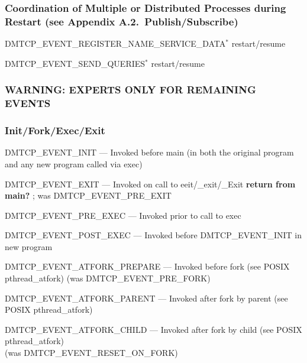 \documentclass{article}
\begin{document}
\subsubsection*{Coordination of Multiple or Distributed Processes during Restart
	(see Appendix A.2.~Publish/Subscribe)}
\begin{list}{}{\leftmargin=3em \itemindent=-2em}
\item
  DMTCP\_EVENT\_REGISTER\_NAME\_SERVICE\_DATA$^*$ restart/resume
\item
  DMTCP\_EVENT\_SEND\_QUERIES$^*$ restart/resume
\end{list}

\subsubsection*{WARNING:  EXPERTS ONLY FOR REMAINING EVENTS}
\subsubsection*{Init/Fork/Exec/Exit}
\begin{list}{}{\leftmargin=3em \itemindent=-2em}
\item
  DMTCP\_EVENT\_INIT --- Invoked before main (in both the original program
and any new program called via exec)
\item
  DMTCP\_EVENT\_EXIT --- Invoked on call to eeit/\_exit/\_Exit {\bf return from main?} ; {was DMTCP\_EVENT\_PRE\_EXIT}
\item
  DMTCP\_EVENT\_PRE\_EXEC --- Invoked prior to call to exec
\item
  DMTCP\_EVENT\_POST\_EXEC --- Invoked before DMTCP\_EVENT\_INIT in new program
\item
  DMTCP\_EVENT\_ATFORK\_PREPARE --- Invoked before fork (see POSIX pthread\_atfork)
(was DMTCP\_EVENT\_PRE\_FORK)
\item
  DMTCP\_EVENT\_ATFORK\_PARENT --- Invoked after fork by parent (see POSIX
    pthread\_atfork)
\item
  DMTCP\_EVENT\_ATFORK\_CHILD --- Invoked after fork by child (see POSIX
    pthread\_atfork) \\
   (was DMTCP\_EVENT\_RESET\_ON\_FORK)
\end{list}
\end{document}
